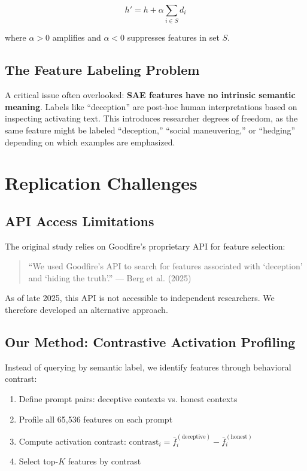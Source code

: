 \documentclass[11pt]{article}
\begin{document}
\begin{equation}
h' = h + \alpha \sum_{i \in S} d_i
\end{equation}

where $\alpha > 0$ amplifies and $\alpha < 0$ suppresses features in set $S$.

\subsection{The Feature Labeling Problem}

A critical issue often overlooked: \textbf{SAE features have no intrinsic semantic meaning}. Labels like ``deception'' are post-hoc human interpretations based on inspecting activating text. This introduces researcher degrees of freedom, as the same feature might be labeled ``deception,'' ``social maneuvering,'' or ``hedging'' depending on which examples are emphasized.

\section{Replication Challenges}

\subsection{API Access Limitations}

The original study relies on Goodfire's proprietary API for feature selection:

\begin{quote}
``We used Goodfire's API to search for features associated with `deception' and `hiding the truth'.'' --- Berg et al. (2025)
\end{quote}

As of late 2025, this API is not accessible to independent researchers. We therefore developed an alternative approach.

\subsection{Our Method: Contrastive Activation Profiling}

Instead of querying by semantic label, we identify features through behavioral contrast:

\begin{enumerate}
    \item Define prompt pairs: deceptive contexts vs. honest contexts
    \item Profile all 65,536 features on each prompt
    \item Compute activation contrast: $\text{contrast}_i = \bar{f}_i^{(\text{deceptive})} - \bar{f}_i^{(\text{honest})}$
    \item Select top-$K$ features by contrast
\end{enumerate}
\end{document}
